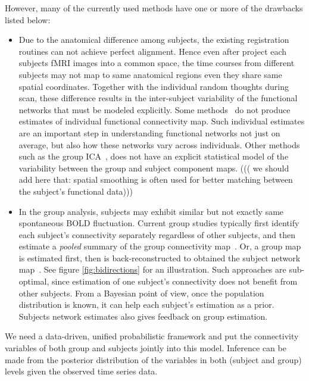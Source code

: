 \documentclass[final,authoryear,5p,twocolumn]{elsarticle}
\begin{document}
However, many of the currently used methods have one or more of the drawbacks
listed below:
\begin{itemize}
\item Due to the anatomical difference among subjects, the existing registration
  routines can not achieve perfect alignment. Hence even after project each
  subjects fMRI images into a common space, the time courses from different
  subjects may not map to same anatomical regions even they share same spatial
  coordinates. Together with the individual random thoughts during scan, these
  difference results in the inter-subject variability of the functional networks
  that must be modeled explicitly. Some methods~\citep{yeo2011organization} do
  not produce estimates of individual functional connectivity map. Such
  individual estimates are an important step in understanding functional
  networks not just on average, but also how these networks vary across
  individuals. Other methods such as the group ICA~\citep{ calhoun2001method,
    calhoun2001spatial}, does not have an explicit statistical model of the
  variability between the group and subject component maps. ((( we should add here that: spatial smoothing is often used for better matching between the subject's functional data)))

\item In the group analysis, subjects may exhibit similar but not exactly same
  spontaneous BOLD fluctuation. Current group studies typically first identify
  each subject's connectivity separately regardless of other subjects, and then
  estimate a \emph{pooled} summary of the group connectivity
  map~\citep{van2008normalized,craddock2011whole}. Or, a group map is estimated
  first, then is back-reconstructed to obtained the subject network
  map~\citep{calhoun2001method}. See figure \ref{fig:bidirections} for an
  illustration.  Such approaches are sub-optimal, since estimation of one
  subject's connectivity does not benefit from other subjects. From a Bayesian
  point of view, once the population distribution is known, it can help each
  subject's estimation as a prior. Subjects network estimates also gives
  feedback on group estimation.
\end{itemize}

We need a data-driven, unified probabilistic framework and put the connectivity
variables of both group and subjects jointly into this model. Inference can be
made from the posterior distribution of the variables in both (subject and
group) levels given the observed time series data.
\end{document}
